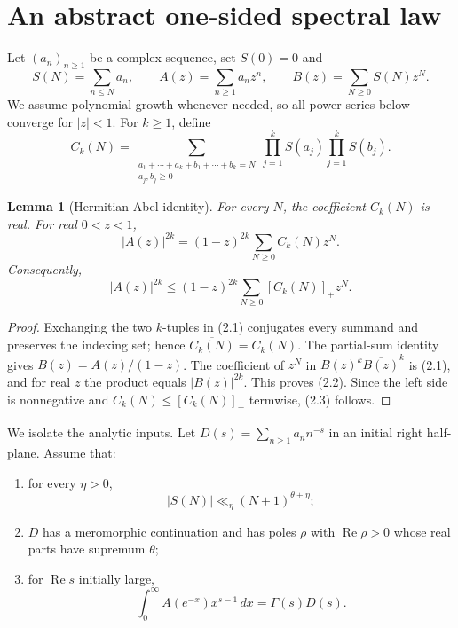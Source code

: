 \documentclass[11pt]{article}
\newtheorem{lemma}[theorem]{Lemma}
\theoremstyle{remark}
\newcommand{\Rea}{\operatorname{Re}}
\begin{document}
\section{An abstract one-sided spectral law}
\label{sec:abstract}

Let $(a_n)_{n\geq1}$ be a complex sequence, set $S(0)=0$ and
\[
 S(N)=\sum_{n\leq N}a_n,
 \qquad
 A(z)=\sum_{n\geq1}a_nz^n,
 \qquad
 B(z)=\sum_{N\geq0}S(N)z^N.
\]
We assume polynomial growth whenever needed, so all power series below converge for $|z|<1$.
For $k\geq1$, define
\begin{equation}
 C_k(N)=
 \sum_{\substack{a_1+\cdots+a_k+b_1+\cdots+b_k=N\\a_j,b_j\geq0}}
 \prod_{j=1}^k S(a_j)\prod_{j=1}^k\overline{S(b_j)}.
 \tag{2.1}
\end{equation}

\begin{lemma}[Hermitian Abel identity]
For every $N$, the coefficient $C_k(N)$ is real.  For real $0<z<1$,
\begin{equation}
 |A(z)|^{2k}=(1-z)^{2k}\sum_{N\geq0}C_k(N)z^N.
 \tag{2.2}
\end{equation}
Consequently,
\begin{equation}
 |A(z)|^{2k}
 \leq(1-z)^{2k}\sum_{N\geq0}[C_k(N)]_+z^N.
 \tag{2.3}
\end{equation}
\end{lemma}

\begin{proof}
Exchanging the two $k$-tuples in (2.1) conjugates every summand and preserves the indexing set;
hence $\overline{C_k(N)}=C_k(N)$.  The partial-sum identity gives
$B(z)=A(z)/(1-z)$.  The coefficient of $z^N$ in
$B(z)^k\overline{B(z)}^k$ is (2.1), and for real $z$ the product equals $|B(z)|^{2k}$.
This proves (2.2).  Since the left side is nonnegative and
$C_k(N)\leq[C_k(N)]_+$ termwise, (2.3) follows.
\end{proof}

We isolate the analytic inputs.  Let $D(s)=\sum_{n\geq1}a_nn^{-s}$ in an initial right
half-plane.  Assume that:
\begin{enumerate}
\item for every $\eta>0$,
\begin{equation}
 |S(N)|\ll_\eta (N+1)^{\theta+\eta};
 \tag{2.4}
\end{equation}
\item $D$ has a meromorphic continuation and has poles $\rho$ with $\Rea\rho>0$ whose real
parts have supremum $\theta$;
\item for $\Rea s$ initially large,
\begin{equation}
 \int_0^\infty A(e^{-x})x^{s-1}\,dx=\Gamma(s)D(s).
 \tag{2.5}
\end{equation}
\end{enumerate}
\end{document}

